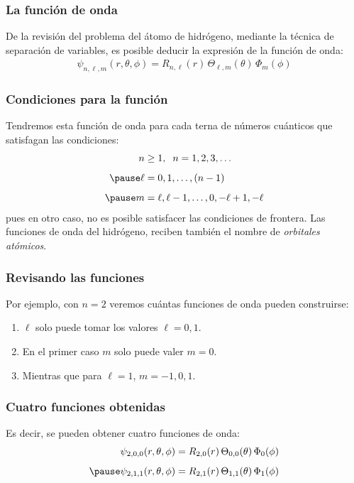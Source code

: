\documentclass[12pt]{beamer}
\begin{document}
\begin{frame}
\frametitle{La función de onda}
De la revisión del problema del átomo de hidrógeno, mediante la técnica de separación de variables, es posible deducir la expresión de la función de onda:
\pause
\begin{align}
\psi_{n, \ell, m} (r, \theta, \phi) = R _{n, \ell} (r) \, \Theta_{\ell, m} (\theta) \, \Phi_{m} (\phi)
\label{ec:ecuacion_07_25}
\end{align}
\end{frame}
\begin{frame}
\frametitle{Condiciones para la función}
Tendremos esta función de onda para cada terna de números cuánticos que satisfagan las condiciones:
\pause
\begin{eqnarray}
\begin{aligned}
n &\geq 1, \hspace{0.2cm} n = 1, 2, 3, \ldots \\[0.5em] \pause
\ell &= 0, 1, \ldots, (n - 1) \\[0.5em] \pause
m &= \ell, \ell - 1, \ldots, 0, - \ell + 1, -\ell
\end{aligned}
\label{eq:ecuacion_07_26}
\end{eqnarray}
pues en otro caso, no es posible satisfacer las condiciones de frontera. \pause Las funciones de onda del hidrógeno, reciben también el nombre de \emph{orbitales atómicos}.
\end{frame}
\begin{frame}
\frametitle{Revisando las funciones}
Por ejemplo, con $n = 2$ \pause veremos cuántas funciones de onda pueden construirse:
\pause
{}
\begin{enumerate}[<+->]
\item $\ell$ solo puede tomar los valores $\ell = 0, 1$.
\item En el primer caso $m$ solo puede valer $m = 0$.
\item Mientras que para $\ell = 1$, $m = -1, 0, 1$.
\end{enumerate}
\end{frame}
\begin{frame}
\frametitle{Cuatro funciones obtenidas}
Es decir, se pueden obtener cuatro funciones de onda:
\pause
\begin{eqnarray*}
\begin{aligned}
\psi_{2, 0, 0} (r, \theta, \phi) &= R_{2, 0} (r) \, \Theta_{0, 0} (\theta) \, \Phi_{0} (\phi) \\[0.5em] \pause
\psi_{2, 1, 1} (r, \theta, \phi) &= R_{2, 1} (r) \, \Theta_{1, 1} (\theta) \, \Phi_{1} (\phi)
\end{aligned}
\end{eqnarray*}
\end{frame}
\end{document}
